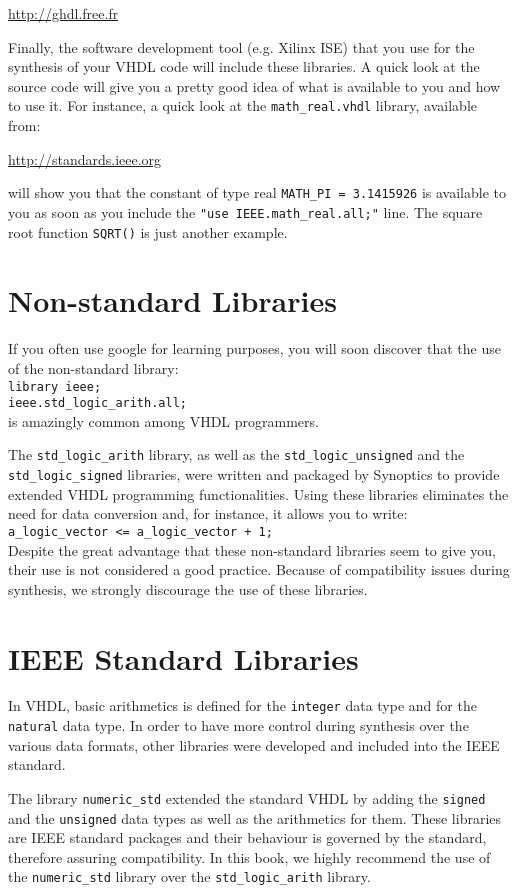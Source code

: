 \url{http://ghdl.free.fr}

Finally, the software development tool (e.g. Xilinx ISE) that you use for the synthesis of your VHDL code will include these libraries. A quick look at the source code will give you a pretty good idea of what is available to you and how to use it. For instance, a quick look at the \texttt{math\_real.vhdl} library, available from: 

\url{http://standards.ieee.org} 

will show you that the constant of type real \texttt{MATH\_PI = 3.1415926} is available to you as soon as you include the \texttt{"use IEEE.math\_real.all;"} line. The square root function \texttt{SQRT()} is just another example.

\section{Non-standard Libraries}
If {you often use google for learning purposes}, you will soon discover that the use of the non-standard library:\\
\texttt{library ieee;}\\
 \texttt{ieee.std\_logic\_arith.all;}\\
is amazingly common among VHDL programmers. 

The \texttt{std\_logic\_arith} library, as well as the \texttt{std\_logic\_unsigned} and the \texttt{std\_logic\_signed} libraries, were written and packaged by Synoptics to provide extended VHDL programming functionalities. Using these libraries eliminates the need for data conversion and, for instance, it allows you to write:\\
\texttt{a\_logic\_vector <= a\_logic\_vector + 1;}\\
Despite the great advantage that these non-standard libraries seem to give you, their use is not considered a good practice. Because of compatibility issues during synthesis, we strongly discourage the use of these libraries.

\section{IEEE Standard Libraries}
In VHDL, basic arithmetics is defined for the \texttt{integer} data type and for the \texttt{natural} data type. In order to have more control during synthesis over the various data formats, other libraries were developed and included into the IEEE standard.

The library \texttt{numeric\_std} extended the standard VHDL by adding the \texttt{signed} and the \texttt{unsigned} data types as well as the arithmetics for them. These libraries are IEEE standard packages and their behaviour is governed by the standard, therefore assuring compatibility. In this book, we highly recommend the use of the \texttt{numeric\_std} library over the \texttt{std\_logic\_arith} library.

